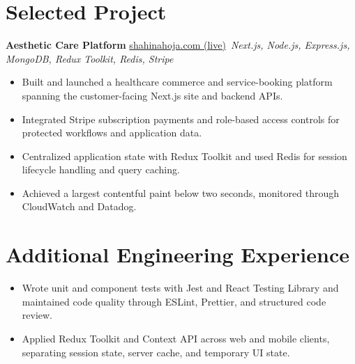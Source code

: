\documentclass[11pt,a4paper,sans]{moderncv}
\begin{document}
\vspace{3pt}


\section{Selected Project}
\vspace{1pt}
\textbf{Aesthetic Care Platform} \hfill \href{https://shahinahoja.com/}{shahinahoja.com (live)}\
\textit{Next.js, Node.js, Express.js, MongoDB, Redux Toolkit, Redis, Stripe}
\begin{itemize}
\item {Built and launched a healthcare commerce and service-booking platform spanning the customer-facing Next.js site and backend APIs.}
\item {Integrated Stripe subscription payments and role-based access controls for protected workflows and application data.}
\item {Centralized application state with Redux Toolkit and used Redis for session lifecycle handling and query caching.}
\item {Achieved a largest contentful paint below two seconds, monitored through CloudWatch and Datadog.}
\end{itemize}

\section{Additional Engineering Experience}
\vspace{1pt}
\begin{itemize}
    \item {Wrote unit and component tests with Jest and React Testing Library and maintained code quality through ESLint, Prettier, and structured code review.}
    \item {Applied Redux Toolkit and Context API across web and mobile clients, separating session state, server cache, and temporary UI state.}
\end{itemize}
\end{document}
